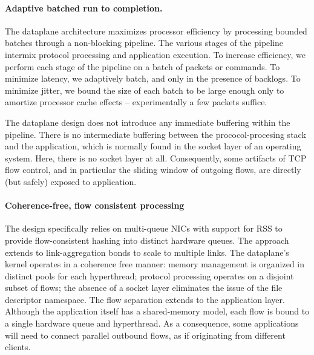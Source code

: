 

\paragraph{Adaptive batched run to completion.}

The dataplane architecture maximizes processor efficiency by
processing bounded batches through a non-blocking pipeline.  The
various stages of the pipeline intermix protocol processing and
application execution.  To increase efficiency, we perform each stage
of the pipeline on a batch of packets or commands.  To minimize
latency, we adaptively batch, and only in the presence of backlogs.
To minimize jitter, we bound the size of each batch to be large enough
only to amortize processor cache effects -- experimentally a few
packets suffice.

The dataplane design does not introduce any immediate buffering within
the pipeline.  There is no intermediate buffering between the
prococol-procesing stack and the application, which is normally found
in the socket layer of an operating system. Here, there is no socket
layer at all.  Consequently, some artifacts of TCP flow control, and
in particular the sliding window of outgoing flows, are directly (but
safely) exposed to application.

\paragraph{Coherence-free, flow consistent processing}

The design specifically relies on multi-queue NICs with support for
RSS to provide flow-consistent hashing into distinct hardware queues.
The approach extends to link-aggregation bonds to scale to multiple
links.  The dataplane's kernel operates in a coherence free manner:
memory management is organized in distinct pools for each hyperthread;
protocol processing operates on a disjoint subset of flows; the
absence of a socket layer eliminates the issue of the file descriptor
namespace.  The flow separation extends to the application layer.
Although the application itself has a shared-memory model, each flow
is bound to a single hardware queue and hyperthread.  As a
consequence, some applications will need to connect parallel outbound
flows, as if originating from different clients.

